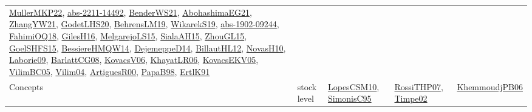 {\begin{longtable}{lp{3cm}>{\raggedright}p{6cm}>{\raggedright}p{6cm}p{8cm}}
\href{articles/MullerMKP22.pdf}{MullerMKP22}\cite{MullerMKP22}, \href{articles/abs-2211-14492.pdf}{abs-2211-14492}\cite{abs-2211-14492}, \href{papers/BenderWS21.pdf}{BenderWS21}\cite{BenderWS21}, \href{articles/AbohashimaEG21.pdf}{AbohashimaEG21}\cite{AbohashimaEG21}, \href{articles/ZhangYW21.pdf}{ZhangYW21}\cite{ZhangYW21}, \href{papers/GodetLHS20.pdf}{GodetLHS20}\cite{GodetLHS20}, \href{papers/BehrensLM19.pdf}{BehrensLM19}\cite{BehrensLM19}, \href{articles/WikarekS19.pdf}{WikarekS19}\cite{WikarekS19}, \href{articles/abs-1902-09244.pdf}{abs-1902-09244}\cite{abs-1902-09244}, \href{articles/FahimiOQ18.pdf}{FahimiOQ18}\cite{FahimiOQ18}, \href{papers/GilesH16.pdf}{GilesH16}\cite{GilesH16}, \href{papers/MelgarejoLS15.pdf}{MelgarejoLS15}\cite{MelgarejoLS15}, \href{papers/SialaAH15.pdf}{SialaAH15}\cite{SialaAH15}, \href{papers/ZhouGL15.pdf}{ZhouGL15}\cite{ZhouGL15}, \href{articles/GoelSHFS15.pdf}{GoelSHFS15}\cite{GoelSHFS15}, \href{papers/BessiereHMQW14.pdf}{BessiereHMQW14}\cite{BessiereHMQW14}, \href{papers/DejemeppeD14.pdf}{DejemeppeD14}\cite{DejemeppeD14}, \href{papers/BillautHL12.pdf}{BillautHL12}\cite{BillautHL12}, \href{articles/NovasH10.pdf}{NovasH10}\cite{NovasH10}, \href{papers/Laborie09.pdf}{Laborie09}\cite{Laborie09}, \href{papers/BarlattCG08.pdf}{BarlattCG08}\cite{BarlattCG08}, \href{papers/KovacsV06.pdf}{KovacsV06}\cite{KovacsV06}, \href{articles/KhayatLR06.pdf}{KhayatLR06}\cite{KhayatLR06}, \href{papers/KovacsEKV05.pdf}{KovacsEKV05}\cite{KovacsEKV05}, \href{articles/VilimBC05.pdf}{VilimBC05}\cite{VilimBC05}, \href{papers/Vilim04.pdf}{Vilim04}\cite{Vilim04}, \href{articles/ArtiguesR00.pdf}{ArtiguesR00}\cite{ArtiguesR00}, \href{articles/PapaB98.pdf}{PapaB98}\cite{PapaB98}, \href{papers/ErtlK91.pdf}{ErtlK91}\cite{ErtlK91}\\
Concepts & stock level & \href{articles/LopesCSM10.pdf}{LopesCSM10}\cite{LopesCSM10}, \href{papers/SimonisC95.pdf}{SimonisC95}\cite{SimonisC95} & \href{papers/RossiTHP07.pdf}{RossiTHP07}\cite{RossiTHP07}, \href{articles/Timpe02.pdf}{Timpe02}\cite{Timpe02} & \href{papers/KhemmoudjPB06.pdf}{KhemmoudjPB06}\cite{KhemmoudjPB06}\\

\end{longtable}}
